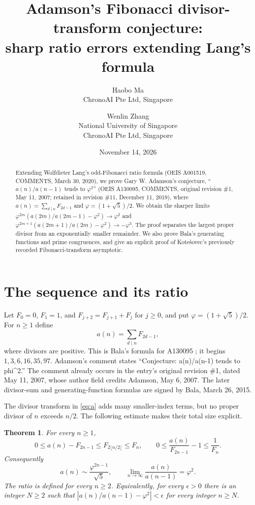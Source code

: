 \documentclass[11pt]{article}
\title{Adamson's Fibonacci divisor-transform conjecture:\\
sharp ratio errors extending Lang's formula}
\author{Haobo Ma\\\small ChronoAI Pte Ltd, Singapore
\and Wenlin Zhang\\\small National University of Singapore\\\small ChronoAI Pte Ltd, Singapore}
\date{November 14, 2026}
\newtheorem{theorem}{Theorem}
\newcommand{\ph}{\varphi}
\begin{document}
\maketitle
\begin{abstract}
Extending Wolfdieter Lang's odd-Fibonacci ratio formula (OEIS A001519,
COMMENTS, March 30, 2020), we prove Gary W. Adamson's conjecture,
``$a(n)/a(n-1)$ tends to $\ph^2$'' (OEIS A130095, COMMENTS,
original revision \#1, May 11, 2007; retained in revision \#11,
December 11, 2019), where $a(n)=\sum_{d\mid n}F_{2d-1}$ and
$\ph=(1+\sqrt5)/2$.
We obtain the sharper limits
$\ph^{2m}(a(2m)/a(2m-1)-\ph^2)\to\ph^2$ and
$\ph^{2m+1}(a(2m+1)/a(2m)-\ph^2)\to-\ph^3$.
The proof separates the largest proper divisor from an exponentially
smaller remainder. We also prove Bala's generating functions and prime
congruences, and give an explicit proof of Kote\v{s}ovec's previously
recorded Fibonacci-transform asymptotic.
\end{abstract}

\section{The sequence and its ratio}
Let $F_0=0$, $F_1=1$, and $F_{j+2}=F_{j+1}+F_j$ for $j\geq0$, and put
$\ph=(1+\sqrt5)/2$. For $n\geq1$ define
\begin{equation}\label{eq:a}
 a(n)=\sum_{d\mid n} F_{2d-1},
\end{equation}
where divisors are positive. This is Bala's formula for A130095
\cite{adamson}; it begins $1,3,6,16,35,97$. Adamson's comment states
``Conjecture: a(n)/a(n-1) tends to phi\^{}2.'' The comment already occurs in
the entry's original revision \#1, dated May 11, 2007, whose author
field credits Adamson, May 6, 2007. The later divisor-sum and
generating-function formulas are signed by Bala, March 26, 2015.

The divisor transform in \eqref{eq:a} adds many smaller-index terms,
but no proper divisor of $n$ exceeds $n/2$. The following estimate
makes their total size explicit.

\begin{theorem}\label{thm:main}
For every $n\geq1$,
\begin{equation}\label{eq:error}
 0\leq a(n)-F_{2n-1}\leq F_{2\lfloor n/2\rfloor}\leq F_n,
 \qquad
 0\leq \frac{a(n)}{F_{2n-1}}-1\leq\frac1{F_n}.
\end{equation}
Consequently
\begin{equation}\label{eq:limit}
 a(n)\sim\frac{\ph^{2n-1}}{\sqrt5},\qquad
 \lim_{n\to\infty}\frac{a(n)}{a(n-1)}=\ph^2.
\end{equation}
The ratio is defined for every $n\geq2$. Equivalently, for every
$\epsilon>0$ there is an integer $N\geq2$ such that
$|a(n)/a(n-1)-\ph^2|<\epsilon$ for every integer $n\geq N$.
\end{theorem}
\end{document}
